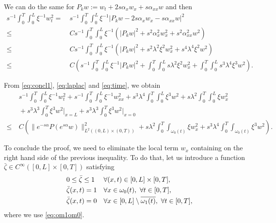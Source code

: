 \documentclass[10pt]{article}
\def\dis{\displaystyle}
\def\om{\omega}
\def\\Phivec{\mathbf{\Phi}}
\newcommand{\ii}{\iiTL }
\newcommand{\iiTL}{\int_0^T\!\!\!\!\int_0^L }
\begin{document}
\begin{appendix}
	We can do the same for $P_{k}w:=w_t+2s\alpha_xw_x+s\alpha_{xx} w$ and then
\begin{equation}\label{eq:time}
\begin{alignedat}{2}
	s^{-1}\ii\xi^{-1} w^2_{t}
	=&~ s^{-1}\ii\xi^{-1}  |P_k w-2s\alpha_xw_x-s\alpha_{xx} w|^2\\
	\leq&~ C s^{-1}\ii\xi^{-1}\left(  |P_k w|^2+ s^2\alpha_x^2w^2_x+s^2\alpha_{xx}^2w^2\right)\\
	\leq&~ C s^{-1}\ii\xi^{-1}\left(  |P_k w|^2+ s^2\lambda^2\xi^2w^2_x+s^4\lambda^4\xi^2w^2\right)\\
	\leq&~ C\left( s^{-1}\ii\xi^{-1} |P_k w|^2+\ii s\lambda^2\xi^2w^2_x+\ii s^3\lambda^4\xi^3w^2\right).
\end{alignedat}
\end{equation}

	From \eqref{eq:concl1}, \eqref{eq:laplac} and \eqref{eq:time}, we obtain
\begin{equation}\label{eq:concl4}
\begin{alignedat}{2}
	&~s^{-1}\ii\xi^{-1} w^2_{t}+s^{-1}\ii\xi^{-1} w^2_{xx}+s^3\lambda^4\ii\xi^3 w^2+s\lambda^2\ii \xi w_x^2\\
	&~+s^3\lambda^3\int_0^T\xi^3 w^2\big|_{x=L}+s^3\lambda^3\int_0^T\xi^3 w^2\big|_{x=0}\\
	\leq&~ C\left(\|e^{-s\alpha} P(e^{s\alpha} w )\|^2_{L^2((0,L)\times(0,T))} +
	s\lambda^2\int_0^T\!\!\!\int_{\om_0(t)}\xi w_x^2
	+s^3\lambda^4\int_0^T\!\!\!\int_{\om_0(t)}\xi^3 w^2\right).
\end{alignedat}
\end{equation}

	To conclude the proof, we need to eliminate the local term $w_x$ containing on the right hand side of the previous inequality.
	To do that, let
	us introduce a
	function $\bar\zeta \in C^\infty([0,L]\times[0,T])$ satisfying
\[
	\begin{array}{lll}
	&0\le \bar\zeta\le 1&\forall (x,t)\in [0,L]\times[0,T],\\
	\noalign{\smallskip}\dis
	&\bar\zeta(x,t) =1&\forall x\in\om_0(t),~\forall t\in[0,T],\\
	\noalign{\smallskip}\dis
	&\bar\zeta(x,t) =0& \forall x\in [0,L]\setminus \overline{\om_1(t)},~ \forall t\in[0,T],
	\end{array}
\]
	where we use \eqref{eq:om1om0}.
	

\end{appendix}
\end{document}
